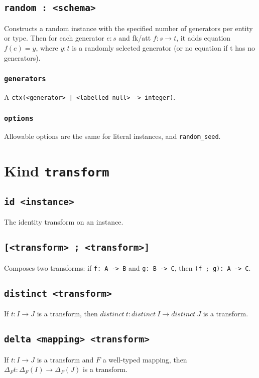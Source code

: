 \documentclass[10pt]{book}
\begin{document}
\section{{\tt random : <schema>}}

Constructs a random instance with the specified number of generators per entity or type. Then for each generator $e:s$ and fk/att $f : s \to t$, it adds equation $f(e) = y$, where $y:t$ is a randomly selected generator (or no equation if t has no generators).

\subsection{{\tt generators}}
A {\tt ctx(<generator> | <labelled null> -> integer)}.

\subsection{{\tt options}}
Allowable options are the same for literal instances, and {\tt random\_seed}.

\chapter{Kind {\tt transform}}
\section{{\tt id <instance>}}
The identity transform on an instance.
\section{{\tt [<transform> ; <transform>]}}
Composes two transforms: if {\tt f: A -> B} and {\tt g: B -> C}, then {\tt (f ; g): A -> C}.

\section{{\tt distinct <transform>}}
If $t : I \to J$ is a transform, then $distinct \ t : distinct \ I \to distinct \ J$ is a transform.

\section{{\tt delta <mapping> <transform>}}
If $t : I \to J$ is a transform and $F$ a well-typed mapping, then $\Delta_Ft : \Delta_F(I) \to \Delta_F(J)$ is a transform.
\end{document}
